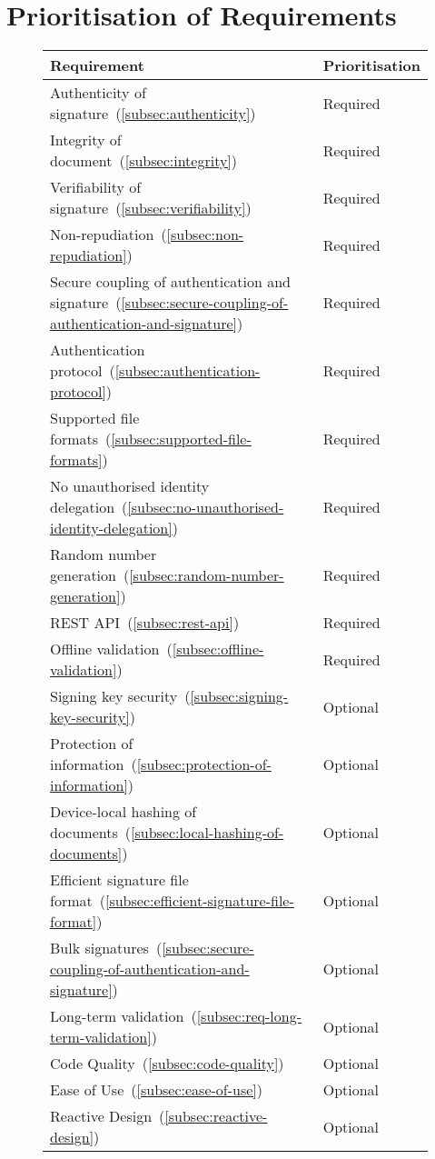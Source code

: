 \section{Prioritisation of Requirements}\label{sec:prioritisation}
\begin{figure}
    \begin{center}
        \begin{tabular}{p{12cm}|p{2.5cm}}
            \textbf{Requirement} & \textbf{Prioritisation}\\
            \hline
            Authenticity of signature~(\ref{subsec:authenticity}) & Required\\
            Integrity of document~(\ref{subsec:integrity}) & Required\\
            Verifiability of signature~(\ref{subsec:verifiability}) & Required\\
            Non-repudiation~(\ref{subsec:non-repudiation}) & Required\\
            Secure coupling of authentication and signature~(\ref{subsec:secure-coupling-of-authentication-and-signature}) & Required\\
            Authentication protocol~(\ref{subsec:authentication-protocol}) & Required\\
            Supported file formats~(\ref{subsec:supported-file-formats}) & Required\\
            No unauthorised identity delegation~(\ref{subsec:no-unauthorised-identity-delegation}) & Required\\
            Random number generation~(\ref{subsec:random-number-generation}) & Required\\
            \gls{REST} \gls{API}~(\ref{subsec:rest-api}) & Required\\
            Offline validation~(\ref{subsec:offline-validation}) & Required\\
            Signing key security~(\ref{subsec:signing-key-security}) & Optional\\
            Protection of information~(\ref{subsec:protection-of-information}) & Optional\\
            Device-local hashing of documents~(\ref{subsec:local-hashing-of-documents}) & Optional\\
            Efficient signature file format~(\ref{subsec:efficient-signature-file-format}) & Optional\\
            Bulk signatures~(\ref{subsec:secure-coupling-of-authentication-and-signature}) & Optional\\
            Long-term validation~(\ref{subsec:req-long-term-validation}) & Optional\\
            Code Quality~(\ref{subsec:code-quality}) & Optional\\
            Ease of Use~(\ref{subsec:ease-of-use}) & Optional\\
            Reactive Design~(\ref{subsec:reactive-design}) & Optional\\
        \end{tabular}
    \end{center}
\end{figure}
